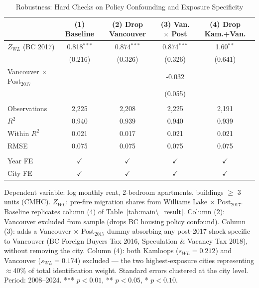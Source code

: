 \begin{table}[htbp]
   \caption{\label{tab:hard_checks} Robustness: Hard Checks on Policy Confounding and Exposure Specificity}
   \bigskip
   \centering
   \begin{tabular}{lcccc}
      \toprule
                                        & (1) Baseline & (2) Drop Vancouver & (3) Van. $\times$ Post & (4) Drop Kam.+Van. \\  
      \midrule 
      $Z_{WL}$ (BC 2017)                & 0.818$^{***}$ & 0.874$^{***}$ & 0.874$^{***}$ & 1.60$^{**}$\\   
                                        & (0.216)       & (0.326)       & (0.326)       & (0.641)\\   
      Vancouver $\times$ Post$_{2017}$  &               &               & -0.032        &   \\   
                                        &               &               & (0.055)       &   \\   
       \\
      Observations                      & 2,225         & 2,208         & 2,225         & 2,191\\  
      $R^2$                             & 0.940         & 0.939         & 0.940         & 0.939\\  
      Within $R^2$                      & 0.021         & 0.017         & 0.021         & 0.021\\  
      RMSE                              & 0.075         & 0.075         & 0.075         & 0.075\\  
       \\
      Year FE                           & $\checkmark$  & $\checkmark$  & $\checkmark$  & $\checkmark$\\   
      City FE                           & $\checkmark$  & $\checkmark$  & $\checkmark$  & $\checkmark$\\   
      \bottomrule
   \end{tabular}
   
   \par \raggedright 
   Dependent variable: log monthly rent, 2-bedroom apartments, buildings $\geq$ 3 units (CMHC). $Z_{WL}$: pre-fire migration shares from Williams Lake $\times$ Post$_{2017}$. Baseline replicates column (4) of Table~\ref{tab:main\_result}. Column (2): Vancouver excluded from sample (drops BC housing policy confound). Column (3): adds a Vancouver $\times$ Post$_{2017}$ dummy absorbing any post-2017 shock specific to Vancouver (BC Foreign Buyers Tax 2016, Speculation \& Vacancy Tax 2018), without removing the city. Column (4): both Kamloops ($s_{WL}=0.212$) and Vancouver ($s_{WL}=0.174$) excluded --- the two highest-exposure cities representing $\approx$40\% of total identification weight. Standard errors clustered at the city level. Period: 2008--2024. *** $p<0.01$, ** $p<0.05$, * $p<0.10$.
\end{table}
